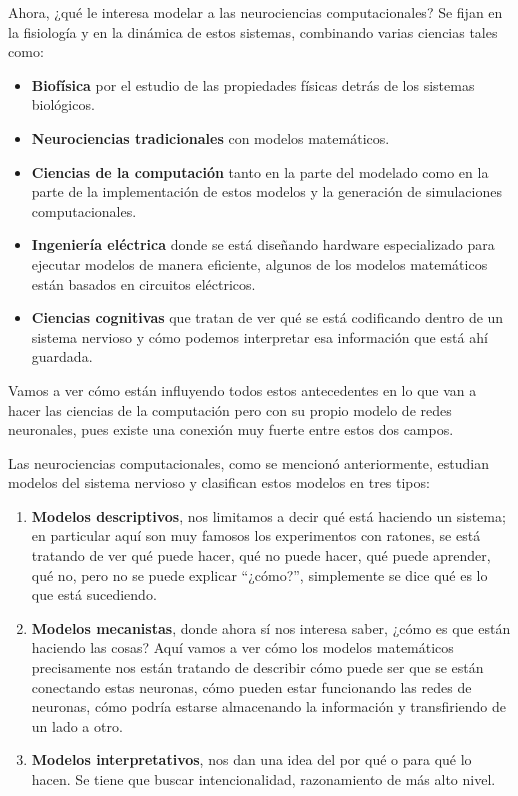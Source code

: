 Ahora, ¿qué le interesa modelar a las neurociencias computacionales? Se fijan en la fisiología y en la dinámica de estos sistemas, combinando varias ciencias tales como: 
\begin{itemize}
 \item  \textbf{Biofísica} por el estudio de las propiedades físicas detrás de los sistemas biológicos.
 \item  \textbf{Neurociencias tradicionales} con modelos matemáticos. 
 \item  \textbf{Ciencias de la computación} tanto en la parte del modelado como en la parte de la implementación de estos modelos y la generación de simulaciones computacionales.
 \item  \textbf{Ingeniería eléctrica} donde se está diseñando hardware especializado para ejecutar modelos de manera eficiente, algunos de los modelos matemáticos están basados en circuitos eléctricos. 
 \item  \textbf{Ciencias cognitivas} que tratan de ver qué se está codificando dentro de un sistema nervioso y cómo podemos interpretar esa información que está ahí guardada.

\end{itemize}

Vamos a ver cómo están influyendo todos estos antecedentes en lo que van a hacer las ciencias de la computación pero con su propio modelo de redes neuronales, pues existe una conexión muy fuerte entre estos dos campos.


Las neurociencias computacionales, como se mencionó anteriormente, estudian modelos del sistema nervioso y clasifican estos modelos en tres tipos: 

\begin{enumerate}
 \item \textbf{Modelos descriptivos}, nos limitamos a decir qué está haciendo un sistema; en particular aquí son muy famosos los experimentos con ratones, se está tratando de ver qué puede hacer, qué no puede hacer, qué puede aprender, qué no, pero no se puede explicar ``¿cómo?'', simplemente se dice qué es lo que está sucediendo.
 
 \item \textbf{Modelos mecanistas}, donde ahora sí nos interesa saber, ¿cómo es que están haciendo las cosas? Aquí vamos a ver cómo los modelos matemáticos precisamente nos están tratando de describir cómo puede ser que se están conectando estas neuronas, cómo pueden estar funcionando las redes de neuronas, cómo podría estarse almacenando la información y transfiriendo de un lado a otro.
 
 \item \textbf{Modelos interpretativos}, nos dan una idea del por qué o para qué lo hacen. Se tiene que buscar intencionalidad, razonamiento de más alto nivel.
\end{enumerate}

